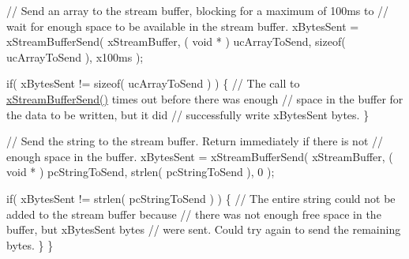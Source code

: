 \begin{DoxyPre}
\begin{DoxyPre}
\begin{DoxyPre}    // Send an array to the stream buffer, blocking for a maximum of 100ms to
    // wait for enough space to be available in the stream buffer.
    xBytesSent = xStreamBufferSend( xStreamBuffer, ( void * ) ucArrayToSend, sizeof( ucArrayToSend ), x100ms );\end{DoxyPre}
\end{DoxyPre}
\end{DoxyPre}



\begin{DoxyPre}
\begin{DoxyPre}
\begin{DoxyPre}    if( xBytesSent != sizeof( ucArrayToSend ) )
    \{
        // The call to \mbox{\hyperlink{stream__buffer_8h_a35cdf3b6bf677086b9128782f762499d}{xStreamBufferSend()}} times out before there was enough
        // space in the buffer for the data to be written, but it did
        // successfully write xBytesSent bytes.
    \}\end{DoxyPre}
\end{DoxyPre}
\end{DoxyPre}



\begin{DoxyPre}
\begin{DoxyPre}
\begin{DoxyPre}    // Send the string to the stream buffer.  Return immediately if there is not
    // enough space in the buffer.
    xBytesSent = xStreamBufferSend( xStreamBuffer, ( void * ) pcStringToSend, strlen( pcStringToSend ), 0 );\end{DoxyPre}
\end{DoxyPre}
\end{DoxyPre}



\begin{DoxyPre}
\begin{DoxyPre}
\begin{DoxyPre}    if( xBytesSent != strlen( pcStringToSend ) )
    \{
        // The entire string could not be added to the stream buffer because
        // there was not enough free space in the buffer, but xBytesSent bytes
        // were sent.  Could try again to send the remaining bytes.
    \}
\}
\end{DoxyPre}
 \end{DoxyPre}
\end{DoxyPre}
